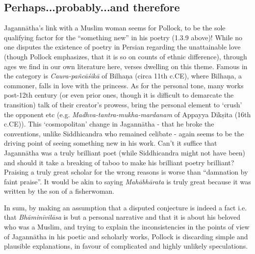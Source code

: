 \subsection{Perhaps...probably...and therefore}

Jagannātha’s link with a Muslim woman seems for Pollock, to be the sole qualifying factor for the “something new” in his poetry (1.3.9 above)! While no one disputes the existence of poetry in Persian regarding the unattainable love (though Pollock emphasizes, that it is so on counts of ethnic difference), through ages we find in our own literature here, verses dwelling on this theme. Famous in the category is {\sl Caura-pañcāśikā} of Bilhaṇa (circa 11th c.CE), where Bilhaṇa, a commoner, falls in love with the princess. As for the personal tone, many works post-12th century (or even prior ones, though it is difficult to demarcate the transition) talk of their creator’s prowess, bring the personal element to ‘crush’ the opponent etc (e.g. {\sl Madhva-tantra-mukha-mardanam} of Appayya Dīkṣita (16th c.CE)). This ‘cosmopolitan’ change in Jagannātha - that he broke the conventions, unlike Siddhicandra who remained celibate - again seems to be the driving point of seeing something new in his work. Can’t it suffice that Jagannātha was a truly brilliant poet (while Siddhicandra might not have been) and should it take a breaking of taboo to make his brilliant poetry brilliant? Praising a truly great scholar for the wrong reasons is worse than “damnation by faint praise”. It would be akin to saying {\sl Mahābhārata} is truly great because it was written by the son of a fisherwoman.

In sum, by making an assumption that a disputed conjecture is indeed a fact i.e. that {\sl Bhāminīvilāsa} is but a personal narrative and that it is about his beloved who was a Muslim, and trying to explain the inconsistencies in the points of view of Jagannātha in his poetic and scholarly works, Pollock is discarding simple and plausible explanations, in favour of complicated and highly unlikely speculations.

\makeatletter
\renewcommand\subsubsection{\@startsection{subsubsection}{3}{\z@}%
                                     {3.25ex\@plus -4ex \@minus -.6ex}%
                                     {1.5ex \@plus .2ex}%
                                     {\normalfont\normalsize\bfseries}}
\makeatother

